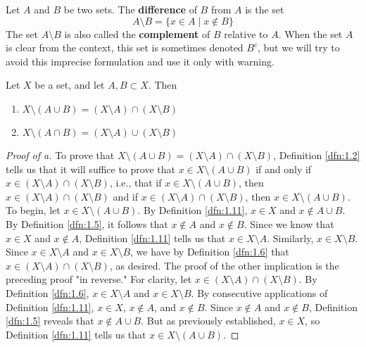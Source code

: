 \documentclass[../main.tex]{subfiles}
\begin{document}
\begin{definition}\label{dfn:1.11}
    Let $A$ and $B$ be two sets. The \textbf{difference} of $B$ from $A$ is the set
    \begin{equation*}
        A\setminus B = \{x\in A\mid x\notin B\}
    \end{equation*}
    The set $A\setminus B$ is also called the \textbf{complement} of $B$ relative to $A$. When the set $A$ is clear from the context, this set is sometimes denoted $B^c$, but we will try to avoid this imprecise formulation and use it only with warning.
\end{definition}

\begin{theorem}\label{trm:1.12}
    Let $X$ be a set, and let $A,B\subset X$. Then
    \begin{enumerate}[label={\alph*\textup{)}},ref={\thetheorem\alph*}]
        \item \label{trm:1.12a}$X\setminus(A\cup B)=(X\setminus A)\cap(X\setminus B)$
        \item \label{trm:1.12b}$X\setminus(A\cap B)=(X\setminus A)\cup(X\setminus B)$
    \end{enumerate}
    \begin{proof}[Proof of a]
        To prove that $X\setminus(A\cup B)=(X\setminus A)\cap(X\setminus B)$, Definition \ref{dfn:1.2} tells us that it will suffice to prove that $x\in X\setminus(A\cup B)$ if and only if $x\in (X\setminus A)\cap(X\setminus B)$, i.e., that if $x\in X\setminus(A\cup B)$, then $x\in (X\setminus A)\cap(X\setminus B)$ and if $x\in (X\setminus A)\cap(X\setminus B)$, then $x\in X\setminus(A\cup B)$. To begin, let $x\in X\setminus(A\cup B)$. By Definition \ref{dfn:1.11}, $x\in X$ and $x\notin A\cup B$. By Definition \ref{dfn:1.5}, it follows that $x\notin A$ and $x\notin B$. Since we know that $x\in X$ and $x\notin A$, Definition \ref{dfn:1.11} tells us that $x\in X\setminus A$. Similarly, $x\in X\setminus B$. Since $x\in X\setminus A$ and $x\in X\setminus B$, we have by Definition \ref{dfn:1.6} that $x\in(X\setminus A)\cap(X\setminus B)$, as desired. The proof of the other implication is the preceding proof "in reverse." For clarity, let $x\in(X\setminus A)\cap(X\setminus B)$. By Definition \ref{dfn:1.6}, $x\in X\setminus A$ and $x\in X\setminus B$. By consecutive applications of Definition \ref{dfn:1.11}, $x\in X$, $x\notin A$, and $x\notin B$. Since $x\notin A$ and $x\notin B$, Definition \ref{dfn:1.5} reveals that $x\notin A\cup B$. But as previously established, $x\in X$, so Definition \ref{dfn:1.11} tells us that $x\in X\setminus(A\cup B)$.

\end{proof}
\end{theorem}
\end{document}
